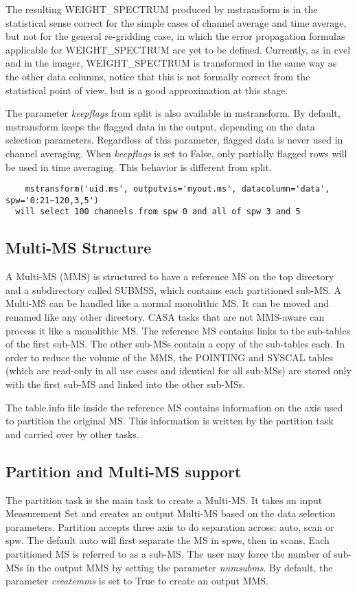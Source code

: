 The resulting WEIGHT\_SPECTRUM produced by mstransform is in the statistical
sense correct for the simple cases of channel average and time average, but not for the 
general re-gridding case, in which the error propagation formulas applicable for 
WEIGHT\_SPECTRUM are yet to be defined. Currently, as in cvel and in the imager,
WEIGHT\_SPECTRUM is transformed in the same way as the other data columns,
notice that this is not formally correct from the statistical point of view, but is a good
approximation at this stage.

The parameter {\it keepflags} from split is also available in mstransform. By
default, mstransform keeps the flagged data in the output, depending on the data
selection parameters. Regardless of this parameter, flagged data is never used
in channel averaging. When {\it keepflags} is set to False, only partially
flagged rows will be used in time averaging. This behavior is different from
split.

\begin{verbatim}
    mstransform('uid.ms', outputvis='myout.ms', datacolumn='data', spw='0:21~120,3,5')
  will select 100 channels from spw 0 and all of spw 3 and 5
\end{verbatim}

\subsection{Multi-MS Structure}
A Multi-MS (MMS) is structured to have a reference MS on the top directory and a subdirectory
called SUBMSS, which contains each partitioned sub-MS. A Multi-MS can be
handled like a normal monolithic MS. It can be moved and renamed like any other
directory. CASA tasks that are not MMS-aware can process it like a monolithic MS.
The reference MS contains links to the sub-tables of the first sub-MS. The other sub-MSs
contain a copy of the sub-tables each. In order to reduce the volume of the MMS, the
POINTING and SYSCAL tables (which are read-only in all use cases and identical for all
sub-MSs) are stored only with the first sub-MS and linked into the other sub-MSs.

The table.info file inside the reference MS contains information on the axis used to partition
the original MS. This information is written by the partition task and carried over by other
tasks.

\subsection{Partition and Multi-MS support}
The partition task is the main task to create a Multi-MS. It takes an input Measurement Set
and creates an output Multi-MS based on the data selection parameters. Partition accepts three
axis to do separation across: auto, scan or spw. The default auto will first separate the MS in
spws, then in scans. Each partitioned MS is referred to as a sub-MS. The user
may force the number of sub-MSs in the output MMS by setting the parameter {\it numsubms}.
By default, the parameter {\it createmms} is set to True to create an output
MMS.

